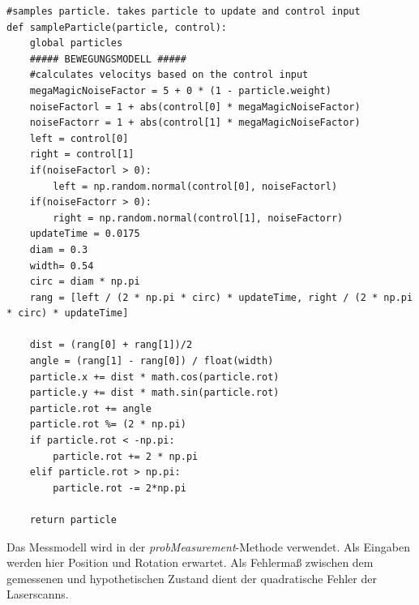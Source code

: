 \documentclass{../Vorlage/mat}
\begin{document}
\begin{lstlisting}
#samples particle. takes particle to update and control input
def sampleParticle(particle, control):
    global particles
    ##### BEWEGUNGSMODELL #####
    #calculates velocitys based on the control input
    megaMagicNoiseFactor = 5 + 0 * (1 - particle.weight)
    noiseFactorl = 1 + abs(control[0] * megaMagicNoiseFactor)
    noiseFactorr = 1 + abs(control[1] * megaMagicNoiseFactor)
    left = control[0]
    right = control[1]
    if(noiseFactorl > 0):
        left = np.random.normal(control[0], noiseFactorl)
    if(noiseFactorr > 0):
        right = np.random.normal(control[1], noiseFactorr)
    updateTime = 0.0175
    diam = 0.3
    width= 0.54
    circ = diam * np.pi
    rang = [left / (2 * np.pi * circ) * updateTime, right / (2 * np.pi * circ) * updateTime]

    dist = (rang[0] + rang[1])/2
    angle = (rang[1] - rang[0]) / float(width)
    particle.x += dist * math.cos(particle.rot)
    particle.y += dist * math.sin(particle.rot)
    particle.rot += angle
    particle.rot %= (2 * np.pi)
    if particle.rot < -np.pi:
        particle.rot += 2 * np.pi
    elif particle.rot > np.pi:
        particle.rot -= 2*np.pi

    return particle
\end{lstlisting}

Das Messmodell wird in der \textit{probMeasurement}-Methode verwendet. Als Eingaben werden hier Position und Rotation erwartet. Als Fehlermaß zwischen dem gemessenen und hypothetischen Zustand dient der quadratische Fehler der Laserscanns.
\end{document}
